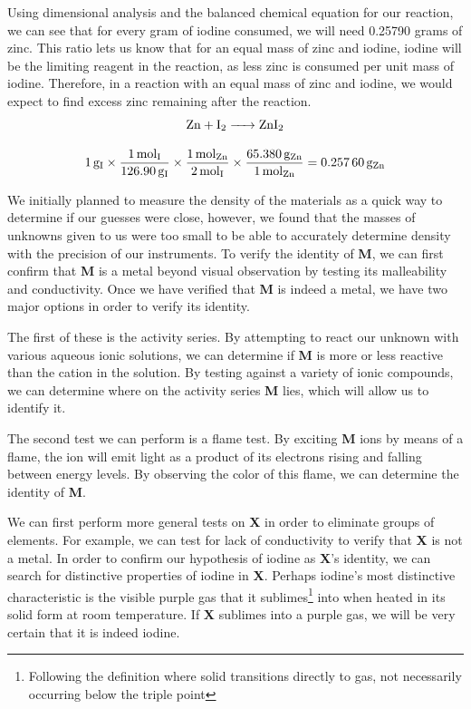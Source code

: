 \documentclass[titlepage]{article}
\begin{document}
Using dimensional analysis and the balanced chemical equation for our reaction, we can see that for every gram of iodine consumed, we will need 0.25790 grams of zinc. This ratio lets us know that for an equal mass of zinc and iodine, iodine will be the limiting reagent in the reaction, as less zinc is consumed per unit mass of iodine. Therefore, in a reaction with an equal mass of zinc and iodine, we would expect to find excess zinc remaining after the reaction.
\begin{gather*}
    \ce{Zn + I2 -> ZnI2} \\[2ex]
    \qty{1}{\gram\of{I}}\times\frac{\qty{1}{\mol\of{I}}}{\qty{126.90}{\gram\of{I}}}\times\frac{\qty{1}{\mol\of{Zn}}}{\qty{2}{\mol\of{I}}}\times\frac{\qty{65.380}{\gram\of{Zn}}}{\qty{1}{\mol\of{Zn}}}=\qty{0.25760}{\gram\of{Zn}}
\end{gather*}

We initially planned to measure the density of the materials as a quick way to determine if our guesses were close, however, we found that the masses of unknowns given to us were too small to be able to accurately determine density with the precision of our instruments. To verify the identity of \textbf{M}, we can first confirm that \textbf{M} is a metal beyond visual observation by testing its malleability and conductivity. Once we have verified that \textbf{M} is indeed a metal, we have two major options in order to verify its identity. 

The first of these is the activity series. By attempting to react our unknown with various aqueous ionic solutions, we can determine if \textbf{M} is more or less reactive than the cation in the solution. By testing against a variety of ionic compounds, we can determine where on the activity series \textbf{M} lies, which will allow us to identify it. 

The second test we can perform is a flame test. By exciting \textbf{M} ions by means of a flame, the ion will emit light as a product of its electrons rising and falling between energy levels. By observing the color of this flame, we can determine the identity of \textbf{M}.
\bigskip

We can first perform more general tests on \textbf{X} in order to eliminate groups of elements. For example, we can test for lack of conductivity to verify that \textbf{X} is not a metal. In order to confirm our hypothesis of iodine as \textbf{X}'s identity, we can search for distinctive properties of iodine in \textbf{X}. Perhaps iodine's most distinctive characteristic is the visible purple gas that it sublimes\footnote{Following the definition where solid transitions directly to gas, not necessarily occurring below the triple point} into when heated in its solid form at room temperature. If \textbf{X} sublimes into a purple gas, we will be very certain that it is indeed iodine.
\end{document}
